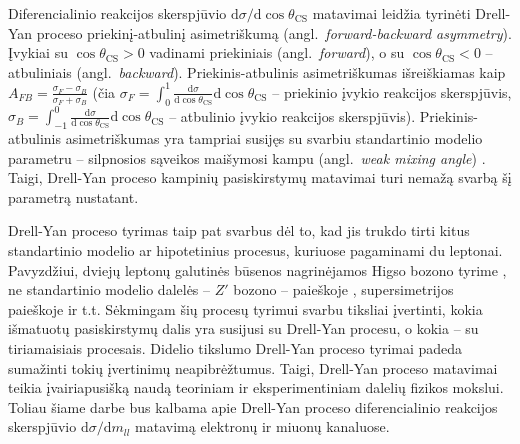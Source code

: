 \documentclass[a4paper, 12pt, oneside]{article}
\begin{document}
Diferencialinio reakcijos skerspjūvio $\mathrm{d}\sigma/\mathrm{d}\!\cos\theta_{\mathrm{CS}}$ matavimai leidžia tyrinėti Drell-Yan proceso
priekinį-atbulinį asimetriškumą (angl.\ \textit{forward-backward asymmetry}).
Įvykiai su $\cos\theta_{\mathrm{CS}}\!>\!0$ vadinami priekiniais (angl.\ \textit{forward}), o su $\cos\theta_{\mathrm{CS}}\!<\!0$ -- atbuliniais
(angl.\ \textit{backward}).
Priekinis-atbulinis asimetriškumas išreiškiamas kaip $A_{FB}=\frac{\sigma_F-\sigma_B}{\sigma_F+\sigma_B}$
(čia $\sigma_F \!=\! \int_0^1\!\frac{\mathrm{d}\sigma}{\mathrm{d}\!\cos\theta_{\mathrm{CS}}}\mathrm{d}\!\cos\!\theta_{\mathrm{CS}}$
-- priekinio įvykio reakcijos skerspjūvis,
$\sigma_B \!=\! \int_{-1}^0\!\frac{\mathrm{d}\sigma}{\mathrm{d}\!\cos\theta_{\mathrm{CS}}}\mathrm{d}\!\cos\!\theta_{\mathrm{CS}}$ -- atbulinio įvykio
reakcijos skerspjūvis).
Priekinis-atbulinis asimetriškumas yra tampriai susijęs su svarbiu standartinio modelio parametru -- silpnosios sąveikos maišymosi kampu
(angl.\ \textit{weak mixing angle}) \cite{DYAFB_CMS2011, DYAFB_ATLAS2015, DYAFB_LHCb2015, DYAFB_CMS2018}.
Taigi, Drell-Yan proceso kampinių pasiskirstymų matavimai turi nemažą svarbą šį parametrą nustatant.

Drell-Yan proceso tyrimas taip pat svarbus dėl to, kad jis trukdo tirti kitus standartinio modelio ar hipotetinius procesus, kuriuose
pagaminami du leptonai.
Pavyzdžiui, dviejų leptonų galutinės būsenos nagrinėjamos Higso bozono tyrime \cite{Higgs2018}, ne standartinio modelio dalelės --
$Z'$ bozono -- paieškoje \cite{Zprime}, supersimetrijos paieškoje \cite{SUSYtau} ir t.t.
Sėkmingam šių procesų tyrimui svarbu tiksliai įvertinti, kokia išmatuotų pasiskirstymų dalis yra susijusi su Drell-Yan procesu, o
kokia -- su tiriamaisiais procesais.
Didelio tikslumo Drell-Yan proceso tyrimai padeda sumažinti tokių įvertinimų neapibrėžtumus.
Taigi, Drell-Yan proceso matavimai teikia įvairiapusišką naudą teoriniam ir eksperimentiniam dalelių fizikos mokslui.
Toliau šiame darbe bus kalbama apie Drell-Yan proceso diferencialinio reakcijos skerspjūvio $\mathrm{d}\sigma/\mathrm{d}m_{ll}$ matavimą
elektronų ir miuonų kanaluose.
\end{document}
